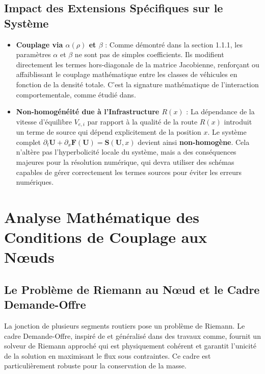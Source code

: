 \subsection{Impact des Extensions Spécifiques sur le Système}
\begin{itemize}
    \item \textbf{Couplage via $\alpha(\rho)$ et $\beta$} : Comme démontré dans la section 1.1.1, les paramètres $\alpha$ et $\beta$ ne sont pas de simples coefficients. Ils modifient directement les termes hors-diagonale de la matrice Jacobienne, renforçant ou affaiblissant le couplage mathématique entre les classes de véhicules en fonction de la densité totale. C'est la signature mathématique de l'interaction comportementale, comme étudié dans.
    \item \textbf{Non-homogénéité due à l'Infrastructure $R(x)$} : La dépendance de la vitesse d'équilibre $V_{e,i}$ par rapport à la qualité de la route $R(x)$ introduit un terme de source qui dépend explicitement de la position $x$. Le système complet $\partial_t \mathbf{U} + \partial_x \mathbf{F}(\mathbf{U}) = \mathbf{S}(\mathbf{U}, x)$ devient ainsi \textbf{non-homogène}. Cela n'altère pas l'hyperbolicité locale du système, mais a des conséquences majeures pour la résolution numérique, qui devra utiliser des schémas capables de gérer correctement les termes sources pour éviter les erreurs numériques.
\end{itemize}

\section{Analyse Mathématique des Conditions de Couplage aux Nœuds}
\subsection{Le Problème de Riemann au Nœud et le Cadre Demande-Offre}
La jonction de plusieurs segments routiers pose un problème de Riemann. Le cadre Demande-Offre, inspiré de et généralisé dans des travaux comme, fournit un solveur de Riemann approché qui est physiquement cohérent et garantit l'unicité de la solution en maximisant le flux sous contraintes. Ce cadre est particulièrement robuste pour la conservation de la masse.

